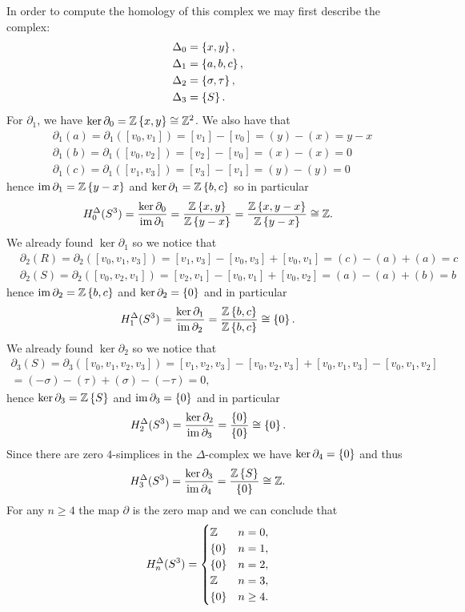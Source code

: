 \documentclass[11pt,a4paper]{article}
\begin{document}
\begin{solution}
  In order to compute the homology of this complex we may first
  describe the complex:
  \begin{align*}
    \Delta_0 &= \left\{x,y\right\}, \\
    \Delta_1 &= \left\{a,b,c\right\}, \\
    \Delta_2 &= \left\{\sigma,\tau\right\}, \\
    \Delta_3 &= \left\{S\right\}.
  \end{align*}
  For $\partial_1$, we have $\ker \partial_0 = \mathbb{Z}\left\{x,y\right\} \cong \mathbb{Z}^2$.
  We also have that
  \begin{align*}
    &\partial_1(a) = \partial_1([v_0,v_1]) = [v_1] - [v_0] = (y) - (x) = y-x \\
    &\partial_1(b) = \partial_1([v_0,v_2]) = [v_2] - [v_0] = (x) - (x) = 0 \\
    &\partial_1(c) = \partial_1([v_1,v_3]) = [v_3] - [v_1] = (y) - (y) = 0
  \end{align*}
  hence $\operatorname{im} \partial_1 = \mathbb{Z}\left\{y - x\right\}$ and $\ker \partial_1 = \mathbb{Z}\left\{b,c\right\}$
  so in particular
  \[
    H^{\Delta}_0(S^3) =
    \frac{\ker \partial_0}{\operatorname{im} \partial_1} =
    \frac{\mathbb{Z}\left\{x,y\right\}}{\mathbb{Z}\left\{y - x\right\}} =
    \frac{\mathbb{Z}\left\{x,y - x\right\}}{\mathbb{Z}\left\{y - x\right\}} \cong \mathbb{Z}.
  \]
  We already found $\ker \partial_1$ so we notice that
  \begin{align*}
    &\partial_2(R) = \partial_2([v_0,v_1,v_3]) =
                  [v_1,v_3] - [v_0,v_3] + [v_0,v_1] = (c) - (a) + (a) = c \\
    &\partial_2(S) = \partial_2([v_0,v_2,v_1]) =
                  [v_2,v_1] - [v_0,v_1] + [v_0,v_2] = (a) - (a) + (b) = b
  \end{align*}
  hence $\operatorname{im} \partial_2 = \mathbb{Z}\left\{b,c\right\}$ and $\ker \partial_2 = \left\{0\right\}$
  and in particular
  \[
    H^{\Delta}_1(S^3) =
    \frac{\ker \partial_1}{\operatorname{im} \partial_2} =
    \frac{\mathbb{Z}\left\{b,c\right\}}{\mathbb{Z}\left\{b,c\right\}} \cong \left\{0\right\}.
  \]
  We already found $\ker \partial_2$ so we notice that
  \begin{multline*}
    \partial_3(S) = \partial_3([v_0,v_1,v_2,v_3])
      = [v_1,v_2,v_3] - [v_0,v_2,v_3] + [v_0,v_1,v_3] - [v_0,v_1,v_2] \\ =
      (-\sigma) - (\tau) + (\sigma) - (-\tau) = 0,
  \end{multline*}
  hence $\ker \partial_3 = \mathbb{Z}\left\{S\right\}$ and $\operatorname{im} \partial_3 = \left\{0\right\}$
  and in particular
  \[
    H^{\Delta}_2(S^3) =
    \frac{\ker \partial_2}{\operatorname{im} \partial_3} =
    \frac{\left\{0\right\}}{\left\{0\right\}} \cong \left\{0\right\}.
  \]
  Since there are zero $4$-simplices in the $\Delta$-complex we have
  $\ker \partial_4 = \left\{0\right\}$ and thus
  \[
    H^{\Delta}_3(S^3) =
    \frac{\ker \partial_3}{\operatorname{im} \partial_4} =
    \frac{\mathbb{Z}\left\{S\right\}}{\left\{0\right\}} \cong \mathbb{Z}.
  \]
  For any $n \geq 4$ the map $\partial$ is the zero map and we can
  conclude that
  \[
    H_n^{\Delta}(S^3) =
    \begin{cases}
      \mathbb{Z} &n = 0, \\
      \left\{0\right\} &n = 1, \\
      \left\{0\right\} &n = 2, \\
      \mathbb{Z} &n = 3, \\
      \left\{0\right\} &n \geq 4.
    \end{cases}
  \]
\end{solution}
\end{document}
